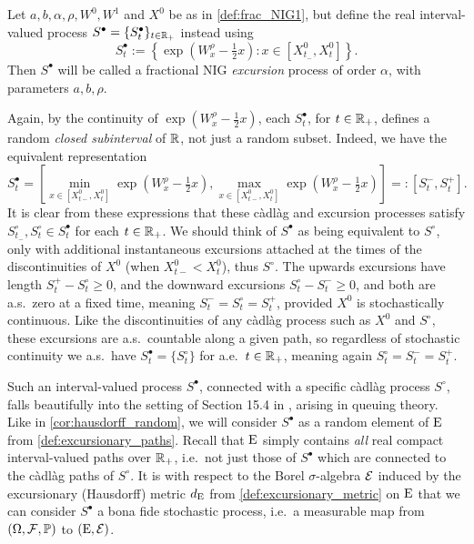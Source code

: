 \begin{definition}\label{def:frac_NIG2}
    Let $a,b,\alpha,\rho,W^0,W^1$ and $X^0$ be as in \autoref{def:frac_NIG1}, but define the real interval-valued process $S^\bullet=\{S^\bullet_t\}_{t\in\mathbb{R}_+}$ instead using
    \begin{equation}\label{eq:frac_NIG_ex}
        S^{\bullet}_t:=\left\{\exp\left(W^\rho_x-\tfrac12 x\right):x\in[X^0_{t_-},X^0_t]\right\}.
    \end{equation}
    Then $S^\bullet$ will be called a fractional NIG \emph{excursion} process of order $\alpha$, with parameters $a,b,\rho$.
\end{definition}

Again, by the continuity of $\exp(W^\rho_x-\tfrac12 x)$, each $S^\bullet_t$, for $t\in\mathbb{R}_+$, defines a random \emph{closed subinterval} of $\mathbb{R}$, not just a random subset. Indeed, we have the equivalent representation
\begin{equation}\label{eq:frac_NIG_ex2}
    S^\bullet_t=\left[\min_{x\in[X^0_{t-},X^0_t]}\exp(W^\rho_x-\tfrac12 x),\max_{x\in[X^0_{t-},X^0_t]}\exp(W^\rho_x-\tfrac12 x)\right]=:[S^-_t,S^+_t].
\end{equation}
It is clear from these expressions that these c\`adl\`ag and excursion processes satisfy $S^\circ_{t_-},S^\circ_t\in S^\bullet_t$ for each $t\in\mathbb{R}_+$. We should think of $S^\bullet$ as being equivalent to $S^\circ$, only with additional instantaneous excursions attached at the times of the discontinuities of $X^0$ (when $X^0_{t-}<X^0_t$), thus $S^\circ$. The upwards excursions have length $S^+_t-S^\circ_t\ge0$, and the downward excursions $S^\circ_t-S^-_t\ge0$, and both are a.s.~zero at a fixed time, meaning $S^-_t=S^\circ_t=S^+_t$, provided $X^0$ is stochastically continuous. Like the discontinuities of any c\`adl\`ag process such as $X^0$ and $S^\circ$, these excursions are a.s.~countable along a given path, so regardless of stochastic continuity we a.s.~have $S^\bullet_t=\{S^\circ_t\}$ for a.e.~$t\in\mathbb{R}_+$, meaning again $S^\circ_t=S^-_t=S^+_t$.

Such an interval-valued process $S^\bullet$, connected with a specific c\`adl\`ag process $S^\circ$, falls beautifully into the setting of Section 15.4 in \cite{whitt_2002}, arising in queuing theory. Like in \autoref{cor:hausdorff_random}, we will consider $S^\bullet$ as a random element of $\mathrm{E}$ from \autoref{def:excursionary_paths}. Recall that $\mathrm{E}$ simply contains \emph{all} real compact interval-valued paths over $\mathbb{R}_+$, i.e.~not just those of $S^\bullet$ which are connected to the c\`adl\`ag paths of $S^\circ$. It is with respect to the Borel $\sigma$-algebra $\mathcal{E}$ induced by the excursionary (Hausdorff) metric $d_{\mathrm{E}}$ from \autoref{def:excursionary_metric} on $\mathrm{E}$ that we can consider $S^\bullet$ a bona fide stochastic process, i.e.~a measurable map from $(\Omega,\mathcal{F},\mathbb{P})$ to $(\mathrm{E},\mathcal{E})$.

